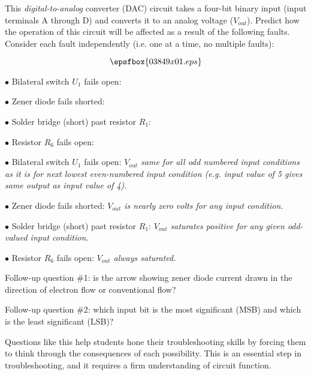 

This {\it digital-to-analog} converter (DAC) circuit takes a four-bit binary input (input terminals A through D) and converts it to an analog voltage ($V_{out}$).  Predict how the operation of this circuit will be affected as a result of the following faults.  Consider each fault independently (i.e. one at a time, no multiple faults):

$$\epsfbox{03849x01.eps}$$

\medskip
\item{$\bullet$} Bilateral switch $U_1$ fails open:
\item{$\bullet$} Zener diode fails shorted:
\item{$\bullet$} Solder bridge (short) past resistor $R_1$:
\item{$\bullet$} Resistor $R_6$ fails open:
\medskip







\medskip
\item{$\bullet$} Bilateral switch $U_1$ fails open: {\it $V_{out}$ same for all odd numbered input conditions as it is for next lowest even-numbered input condition (e.g. input value of 5 gives same output as input value of 4).}
\item{$\bullet$} Zener diode fails shorted: {\it $V_{out}$ is nearly zero volts for any input condition.}
\item{$\bullet$} Solder bridge (short) past resistor $R_1$: {\it $V_{out}$ saturates positive for any given odd-valued input condition.}
\item{$\bullet$} Resistor $R_6$ fails open: {\it $V_{out}$ always saturated.}
\medskip

\vskip 10pt

Follow-up question \#1: is the arrow showing zener diode current drawn in the direction of electron flow or conventional flow?

\vskip 10pt

Follow-up question \#2: which input bit is the most significant (MSB) and which is the least significant (LSB)?







Questions like this help students hone their troubleshooting skills by forcing them to think through the consequences of each possibility.  This is an essential step in troubleshooting, and it requires a firm understanding of circuit function.




